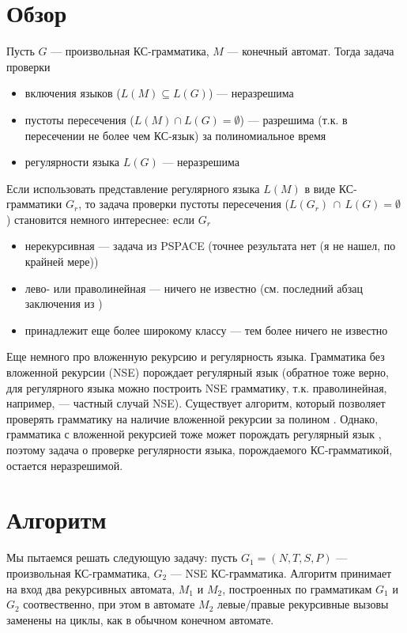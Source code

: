 \documentclass[14pt]{matmex-diploma-custom}
\begin{document}
\section{Обзор}

Пусть $G$ --- произвольная КС-грамматика, $M$ --- конечный автомат. Тогда задача проверки
\begin{itemize}
	\item включения языков ($L(M) \subseteq L(G)$) --- неразрешима
	\item пустоты пересечения ($L(M) \cap L(G) = \emptyset$) --- разрешима (т.к. в пересечении не более чем КС-язык) за полиномиальное время \cite{Hunt}
	\item регулярности языка $L(G)$ --- неразрешима \cite{Greibach1968}
\end{itemize} 

Если использовать представление регулярного языка $L(M)$ в виде КС-грамматики $G_r$, то задача проверки пустоты пересечения ($L(G_r) \, \cap \, L(G) = \emptyset$) становится немного интереснее: если $G_r$ 
\begin{itemize}
	\item нерекурсивная --- задача из PSPACE \cite{Nederhof} (точнее результата нет (я не нашел, по крайней мере))
	\item лево- или праволинейная --- ничего не известно (см. последний абзац заключения из \cite{Nederhof})
	\item принадлежит еще более широкому классу --- тем более ничего не известно
\end{itemize}

Еще немного про вложенную рекурсию и регулярность языка. Грамматика без вложенной рекурсии (NSE) порождает регулярный язык \cite{Chomsky} (обратное тоже верно, для регулярного языка можно построить NSE грамматику, т.к. праволинейная, например, --- частный случай NSE). Существует алгоритм, который позволяет проверять грамматику на наличие вложенной рекурсии за полином \cite{Anselmo}. Однако, грамматика с вложенной рекурсией тоже может порождать регулярный язык \cite{Andrei2004}, поэтому задача о проверке регулярности языка, порождаемого КС-грамматикой, остается неразрешимой. 

\section{Алгоритм}
	
Мы пытаемся решать следующую задачу: пусть $G_1 = (N, T, S, P)$ --- произвольная КС-грамматика, $G_2$ --- NSE КС-грамматика. Алгоритм принимает на вход два рекурсивных автомата, $M_1$ и $M_2$, построенных по грамматикам $G_1$ и $G_2$ соотвественно, при этом в автомате $M_2$ левые/правые рекурсивные вызовы заменены на циклы, как в обычном конечном автомате.
\end{document}

